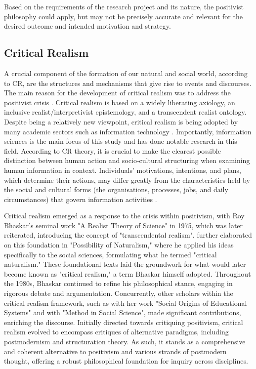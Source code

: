 \par{Based on the requirements of the research project and its nature, the positivist philosophy could apply, but may not be precisely accurate and relevant for the desired outcome and intended motivation and strategy.
\subsection{Critical Realism}
\par{A crucial component of the formation of our natural and social world, according to CR, are the structures and mechanisms that give rise to events and discourses.
The main reason for the development of critical realism was to address the positivist crisis \citep{carlsson2003critical}. Critical realism is based on a widely liberating axiology, an inclusive realist/interpretivist epistemology, and a transcendent realist ontology. Despite being a relatively new viewpoint, critical realism is being adopted by many academic sectors such as information technology \citep{easton2010critical}. Importantly, information sciences is the main focus of  this study and \cite{wikgren2005critical} has done notable research in this field. According to CR theory, it is crucial to make the clearest possible distinction between human action and socio-cultural structuring when examining human information in context. Individuals' motivations, intentions, and plans, which determine their actions, may differ greatly from the characteristics held by the social and cultural forms (the organisations, processes, jobs, and daily circumstances) that govern information activities \citep{wikgren2005critical}.}
\par{Critical realism emerged as a response to the crisis within positivism, with Roy Bhaskar's seminal work "A Realist Theory of Science" in 1975, which was later reiterated, introducing the concept of "transcendental realism". \cite{bhaskar2013realist} further elaborated on this foundation in "Possibility of Naturalism,"  where he applied his ideas specifically to the social sciences, formulating what he termed "critical naturalism." These foundational texts laid the groundwork for what would later become known as "critical realism," a term Bhaskar himself adopted. Throughout the 1980s, Bhaskar continued to refine his philosophical stance, engaging in rigorous debate and argumentation. Concurrently, other scholars within the critical realism framework, such as \cite{archer2013social} with her work "Social Origins of Educational Systems" and \cite{sayer1992method} with "Method in Social Science", made significant contributions, enriching the discourse. Initially directed towards critiquing positivism, critical realism evolved to encompass critiques of alternative paradigms, including postmodernism and structuration theory. As such, it stands as a comprehensive and coherent alternative to positivism and various strands of postmodern thought, offering a robust philosophical foundation for inquiry across disciplines.}
}
